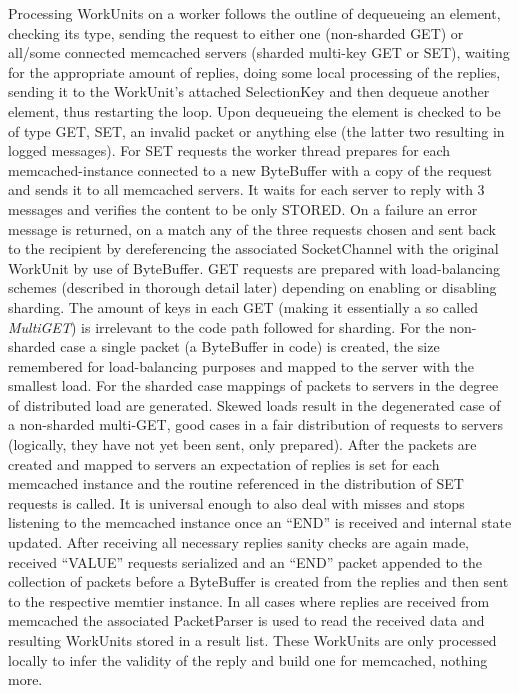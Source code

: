         Processing WorkUnits on a worker follows the outline of dequeueing an element, checking its type, sending the
        request to either one (non-sharded GET) or all/some connected memcached servers (sharded multi-key GET or SET),
        waiting for the appropriate amount of replies, doing some local processing of the replies, sending it to the
        WorkUnit's attached SelectionKey and then dequeue another element, thus restarting the loop. Upon dequeueing the
        element is checked to be of type GET, SET, an invalid packet or anything else (the latter two resulting in
        logged messages). For SET requests the worker thread prepares for each memcached-instance connected to a new
        ByteBuffer with a copy of the request and sends it to all memcached servers. It waits for each server to reply
        with 3 messages and verifies the content to be only STORED. On a failure an error message is returned, on a
        match any of the three requests chosen and sent back to the recipient by dereferencing the associated
        SocketChannel with the original WorkUnit by use of ByteBuffer. GET requests are prepared with load-balancing
        schemes (described in thorough detail later) depending on enabling or disabling sharding. The amount of keys in
        each GET (making it essentially a so called \emph{MultiGET}) is irrelevant to the code path followed for
        sharding. For the non-sharded case a single packet (a ByteBuffer in code) is created, the size remembered for
        load-balancing purposes and mapped to the server with the smallest load. For the sharded case mappings of
        packets to servers in the degree of distributed load are generated. Skewed loads result in the degenerated case
        of a non-sharded multi-GET, good cases in a fair distribution of requests to servers (logically, they have not
        yet been sent, only prepared).  After the packets are created and mapped to servers an expectation of replies is
        set for each memcached instance and the routine referenced in the distribution of SET requests is called. It is
        universal enough to also deal with misses and stops listening to the memcached instance once an ``END'' is
        received and internal state updated. After receiving all necessary replies sanity checks are again made,
        received ``VALUE'' requests serialized and an ``END'' packet appended to the collection of packets before a
        ByteBuffer is created from the replies and then sent to the respective memtier instance. In all cases where
        replies are received from memcached the associated PacketParser is used to read the received data and resulting
        WorkUnits stored in a result list. These WorkUnits are only processed locally to infer the validity of the
        reply and build one for memcached, nothing more.

